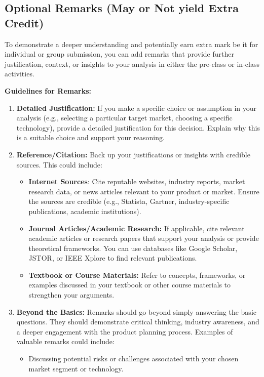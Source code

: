 \subsection*{Optional Remarks (May or Not yield Extra Credit)}

To demonstrate a deeper understanding and potentially earn extra mark be it for individual or group submission, you can add remarks that provide further justification, context, or insights to your analysis in either the pre-class or in-class activities.

\textbf{Guidelines for Remarks:}

\begin{enumerate}
\item \textbf{Detailed Justification:} If you make a specific choice or assumption in your analysis (e.g., selecting a particular target market, choosing a specific technology), provide a detailed justification for this decision. Explain why this is a suitable choice and support your reasoning.
\item \textbf{Reference/Citation:} Back up your justifications or insights with credible sources. This could include:
\begin{itemize}
\item \textbf{Internet Sources}: Cite reputable websites, industry reports, market research data, or news articles relevant to your product or market. Ensure the sources are credible (e.g., Statista, Gartner, industry-specific publications, academic institutions).
\item \textbf{Journal Articles/Academic Research:} If applicable, cite relevant academic articles or research papers that support your analysis or provide theoretical frameworks. You can use databases like Google Scholar, JSTOR, or IEEE Xplore to find relevant publications.
\item \textbf{Textbook or Course Materials:} Refer to concepts, frameworks, or examples discussed in your textbook or other course materials to strengthen your arguments.
\end{itemize}
\item \textbf{Beyond the Basics:} Remarks should go beyond simply answering the basic questions. They should demonstrate critical thinking, industry awareness, and a deeper engagement with the product planning process. Examples of valuable remarks could include:
\begin{itemize}
\item Discussing potential risks or challenges associated with your chosen market segment or technology.

\end{itemize}
\end{enumerate}
